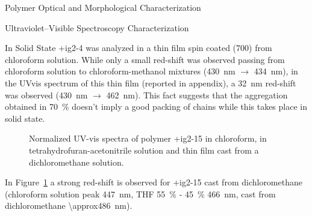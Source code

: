 \begin{section}{Polymer Optical and Morphological Characterization}
\begin{subsection}{Ultraviolet--Visible Spectroscopy Characterization}
\begin{subsubsection}{In Solid State}
\label{ig2-4-uvvis}
\cmpd+{ig2-4} was analyzed in a thin film spin coated (\SI{700}{\rpm}) from chloroform solution. While only a small red-shift was observed passing from chloroform solution to chloro\-form-methanol mixtures (\SI{430}{\nm} $\rightarrow$ \SI{434}{\nm}), in the \gls{UVvis} spectrum of this thin film (reported in appendix), a \SI{32}{\nm} red-shift was observed (\SI{430}{\nm} $\rightarrow$ \SI{462}{\nm}). This fact suggests that the aggregation obtained in 70~\%  doesn't imply a good packing of chains while this takes place in solid state.

\begin{figure}[tbp]%
 \caption[UV-vis spectra of polymer \cmpd+{ig2-15} in solution and thin film.]{Normalized UV-vis spectra of polymer \cmpd+{ig2-15} in chloroform, in tetra\-hydro\-furan-aceto\-nitrile solution and thin film cast from a dichloromethane solution.}
\label{fig:ig2-15-uvvis-film}
\end{figure}

\label{ig2-15-uvvis-film}
In Figure~\ref{fig:ig2-15-uvvis-film} a strong red-shift is observed for \cmpd+{ig2-15} cast from dichloromethane (chloroform solution peak \SI{447}{\nm}, \gls{THF} 55~\% -  45~\% \SI{466}{\nm}, cast from dichloromethane \SI{\approx486}{\nm}).


\end{subsubsection}
\end{subsection}
\end{section}
